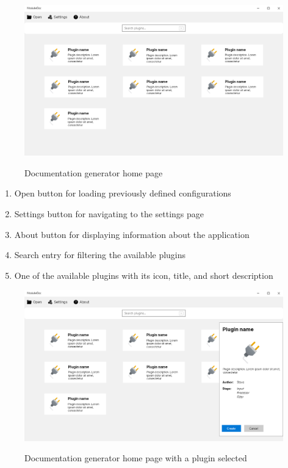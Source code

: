 \begin{figure}[H]
    \includegraphics[width=\linewidth]{img/mockHome.png}
    \label{fig:homePage}
    \caption{Documentation generator home page}
\end{figure}

\begin{enumerate}
    \item Open button for loading previously defined configurations
    \item Settings button for navigating to the settings page
    \item About button for displaying information about the application
    \item Search entry for filtering the available plugins
    \item One of the available plugins with its icon, title, and short description
\end{enumerate}

\begin{figure}[H]
    \includegraphics[width=\linewidth]{img/mockHome-PluginSelected.png}
    \label{fig:homePagePluginSelected}
    \caption{Documentation generator home page with a plugin selected}
\end{figure}

